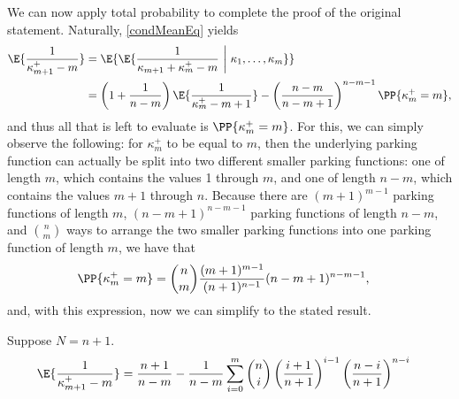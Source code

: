 We can now apply total probability to complete the proof of the original statement. Naturally, \eqref{condMeanEq} yields
\begin{align}
\E{\frac{1}{\kappa_{m+1}^+ - m} }
&=
\E{\E{\frac{1}{\kappa_{m+1} + \kappa_m^+ - m} ~\bigg|~ \kappa_1, \dots, \kappa_m}}
\\
&=
\left(1 + \frac{1}{n-m}\right)\E{\frac{1}{\kappa_m^+ - m + 1}}
-
\left(\frac{n-m}{n-m+1}\right)^{n-m-1}\PP{\kappa_m^+ = m}
,
\end{align}
and thus all that is left to evaluate is $\PP{\kappa_m^+ = m}$. For this, we can simply observe the following: for $\kappa_m^+$ to be equal to $m$, then the underlying parking function can actually be split into two different smaller parking functions: one of length $m$, which contains the values 1 through $m$, and one of length $n - m$, which contains the values $m+1$ through $n$. Because there are $(m+1)^{m-1}$ parking functions of length $m$, $(n-m+1)^{n-m-1}$ parking functions of length $n-m$, and ${n \choose m}$ ways to arrange the two  smaller parking functions into one parking function of length $m$, we have that
\begin{align}
\PP{\kappa_m^+ = m}
&=
{n \choose m}\frac{(m+1)^{m-1}}{(n+1)^{n-1}}(n-m+1)^{n-m-1}
,
\end{align}
and, with this expression, now we can simplify to the stated result.
\hfill\Halmos\endproof

\begin{corollary}\label{meanRecurSolve}
Suppose $N = n + 1$.
\begin{align}
\E{\frac{1}{\kappa_{m+1}^+ - m} }
&=
\frac{n+1}{n-m}
-
\frac{1}{n-m}
\sum_{i=0}^m
{n \choose i}
\left(\frac{i+1}{n+1}\right)^{i-1}
\left(\frac{n-i}{n+1}\right)^{n-i}
\end{align}
\end{corollary}
\hfill\Halmos\endproof




